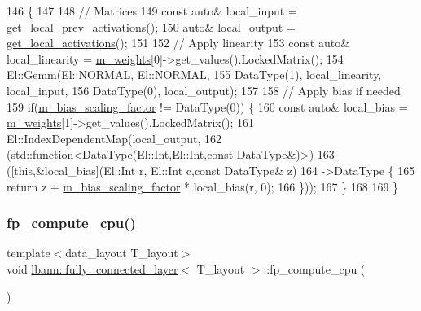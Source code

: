 \begin{DoxyCode}
146                                                                      \{
147 
148   \textcolor{comment}{// Matrices}
149   \textcolor{keyword}{const} \textcolor{keyword}{auto}& local\_input = \hyperlink{classlbann_1_1Layer_a35397843bb0c84030000c7d872229acb}{get\_local\_prev\_activations}();
150   \textcolor{keyword}{auto}& local\_output = \hyperlink{classlbann_1_1Layer_a4248f27acebf72b7b7b3ee39c8bcb62a}{get\_local\_activations}();
151 
152   \textcolor{comment}{// Apply linearity}
153   \textcolor{keyword}{const} \textcolor{keyword}{auto}& local\_linearity = \hyperlink{classlbann_1_1Layer_a7954e30fbf9100a6ba4b56d02767a469}{m\_weights}[0]->get\_values().LockedMatrix();
154   El::Gemm(El::NORMAL, El::NORMAL,
155            DataType(1), local\_linearity, local\_input,
156            DataType(0), local\_output);
157 
158   \textcolor{comment}{// Apply bias if needed}
159   \textcolor{keywordflow}{if}(\hyperlink{classlbann_1_1fully__connected__layer_ae02eaffd5528bf572883f8b06d1b40c0}{m\_bias\_scaling\_factor} != DataType(0)) \{
160     \textcolor{keyword}{const} \textcolor{keyword}{auto}& local\_bias = \hyperlink{classlbann_1_1Layer_a7954e30fbf9100a6ba4b56d02767a469}{m\_weights}[1]->get\_values().LockedMatrix();
161     El::IndexDependentMap(local\_output,
162                           (std::function<DataType(El::Int,El::Int,\textcolor{keyword}{const} DataType&)>)
163                           ([\textcolor{keyword}{this},&local\_bias](El::Int r, El::Int c,\textcolor{keyword}{const} DataType& z)
164                            ->DataType \{
165                             \textcolor{keywordflow}{return} z + \hyperlink{classlbann_1_1fully__connected__layer_ae02eaffd5528bf572883f8b06d1b40c0}{m\_bias\_scaling\_factor} * local\_bias(r, 0);
166                           \}));
167   \}
168 
169 \}
\end{DoxyCode}
\mbox{\label{classlbann_1_1fully__connected__layer_a732ac5715ba0cea535c2bd062f634527}} 
\subsubsection{\texorpdfstring{fp\+\_\+compute\+\_\+cpu()}{fp\_compute\_cpu()}\hspace{0.1cm}{\footnotesize\ttfamily [3/3]}}
{\footnotesize\ttfamily template$<$data\+\_\+layout T\+\_\+layout$>$ \\
void \hyperlink{classlbann_1_1fully__connected__layer}{lbann\+::fully\+\_\+connected\+\_\+layer}$<$ T\+\_\+layout $>$\+::fp\+\_\+compute\+\_\+cpu (\begin{DoxyParamCaption}{ }\end{DoxyParamCaption})\hspace{0.3cm}{\ttfamily [private]}}

